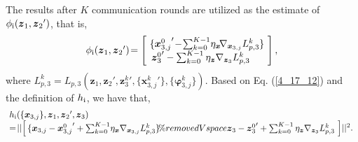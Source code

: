 \documentclass[letterpaper]{article} %
\begin{document}
The results after $K$ communication rounds are utilized as the estimate of $\phi_{\rm{\uppercase\expandafter{\romannumeral1}}}({\boldsymbol{z}_1},{\boldsymbol{z}_2}')$, that is,
\begin{equation}
\begin{array}{l}
\label{4_17_12}
\phi_{\rm{\uppercase\expandafter{\romannumeral1}}}({\boldsymbol{z}_1},{\boldsymbol{z}_2}')
\! = \left[ \begin{array}{l}
\! \{ {\boldsymbol{x}_{3,j}^{0}}' \!-\!\sum\nolimits_{k = 0}^{K-1} \! \eta_{\boldsymbol{x}} \! \nabla_{\boldsymbol{x}_{3,j}} L_{p,3}^k \} \! \\%

{\boldsymbol{z}_3^{0}}'-\sum\nolimits_{k = 0}^{K-1}\eta_{\boldsymbol{z}} \nabla_{\boldsymbol{z}_3} L_{p,3}^k
\end{array} \right] ,
\end{array}
\end{equation}
where $L_{p,3}^k = L_{p,3}({\boldsymbol{z}_1},{\boldsymbol{z}_2}', {\boldsymbol{z}_3^k}', \{{\boldsymbol{x}_{3,j}^k}'\}, \{\boldsymbol{\varphi}_{3,j}^k\})$. Based on Eq. (\ref{4_17_12}) and the definition of $h_{\rm{\uppercase\expandafter{\romannumeral1}}}$, we have that,
\begin{equation}
\begin{array}{l}
\label{eq:5_8_9}
\!h_{\rm{\uppercase\expandafter{\romannumeral1}}}(\{{\boldsymbol{x}_{3,j}}\},\boldsymbol{z}_1, {\boldsymbol{z}_2}',\boldsymbol{z}_3 ) \\ \!=\! ||\! \left[ \! \begin{array}{l}
\! \{ \boldsymbol{x}_{3,j} - {\boldsymbol{x}_{3,j}^{0}}'+\sum\nolimits_{k = 0}^{K-1} \!
\eta_{\boldsymbol{x}} \nabla_{\boldsymbol{x}_{3,j}} L_{p,3}^k \} \!  \%removedVspace

\boldsymbol{z}_3 - {\boldsymbol{z}_3^{0}}'+\sum\nolimits_{k = 0}^{K-1}\eta_{\boldsymbol{z}} \nabla_{\boldsymbol{z}_3} L_{p,3}^k
\end{array} \! \right] \! ||^2 .
\end{array}
\end{equation}
\end{document}
